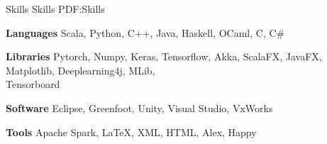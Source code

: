 \Section
{Skills}
{Skills}
{PDF:Skills}

\Entry
\textbf{Languages}
\SubEntry
\Gap
Scala, Python, C++, Java, Haskell, OCaml, C, C\#

\BigGap
\Entry
\textbf{Libraries}
\SubEntry
\Gap
Pytorch, Numpy, Keras, Tensorflow, Akka, ScalaFX, JavaFX, Matplotlib, Deeplearning4j, MLib, \\Tensorboard

\BigGap
\Entry
\textbf{Software}
\SubEntry
\Gap
Eclipse, Greenfoot, Unity, Visual Studio, VxWorks

\BigGap
\Entry
\textbf{Tools}
\SubEntry
\Gap
Apache Spark, LaTeX, XML, HTML, Alex, Happy
